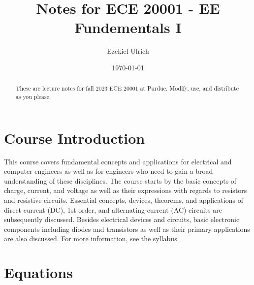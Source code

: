\documentclass[nobib]{tufte-handout}
\title{Notes for ECE 20001 - EE Fundementals I}
\author[Ezekiel Ulrich]{Ezekiel Ulrich}
\date{\today}  %
\begin{document}
\maketitle

\begin{abstract}
These are lecture notes for fall 2023 ECE 20001 at Purdue. Modify, use, and distribute as you please.
\end{abstract}

\tableofcontents

\section{Course Introduction}

This course covers fundamental concepts and applications 
for electrical and computer engineers as well as for engineers
 who need to gain a broad understanding of these disciplines. 
 The course starts by the basic concepts of charge, current, 
 and voltage as well as their expressions with regards to 
 resistors and resistive circuits. Essential concepts, 
 devices, theorems, and applications of direct-current (DC), 
 1st order, and alternating-current (AC) circuits are 
 subsequently discussed. Besides electrical devices and 
 circuits, basic electronic components including diodes and 
 transistors as well as their primary applications are also 
 discussed. For more information, see the syllabus. 

\section{Equations}
\end{document}
